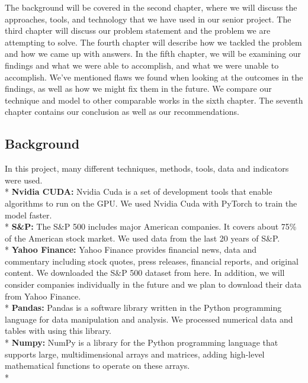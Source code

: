 \documentclass{article}
\begin{document}
The background will be covered in the second chapter, where we will discuss the approaches, tools, and technology that we have used in our senior project. The third chapter will discuss our problem statement and the problem we are attempting to solve. The fourth chapter will describe how we tackled the problem and how we came up with answers. In the fifth chapter, we will be examining our findings and what we were able to accomplish, and what we were unable to accomplish. We've mentioned flaws we found when looking at the outcomes in the findings, as well as how we might fix them in the future. We compare our technique and model to other comparable works in the sixth chapter. The seventh chapter contains our conclusion as well as our recommendations.

\begin{center}
    \item\section{Background}
\end{center}
In this project, many different techniques, methods, tools, data and indicators were used.\vspace{0.25cm} \\*
\textbf{Nvidia CUDA:} Nvidia Cuda is a set of development tools that enable algorithms to run on the GPU. We used Nvidia Cuda with PyTorch to train the model faster.\vspace{0.1cm}\\*
\textbf{S\&P:} The S\&P 500 includes major American companies. It covers about 75\% of the American stock market. We used data from the last 20 years of S\&P.\vspace{0.1cm}\\*
\textbf{Yahoo Finance:} Yahoo Finance provides financial news, data and commentary including stock quotes, press releases, financial reports, and original content. We downloaded the S\&P 500 dataset from here. In addition, we will consider companies individually in the future and we plan to download their data from Yahoo Finance.\vspace{0.1cm}\\*
\textbf{Pandas:} Pandas is a software library written in the Python programming language for data manipulation and analysis. We processed numerical data and tables with using this library.\vspace{0.1cm}\\*
\textbf{Numpy:} NumPy is a library for the Python programming language that supports large, multidimensional arrays and matrices, adding high-level mathematical functions to operate on these arrays.\vspace{0.1cm}\\*
\end{document}
